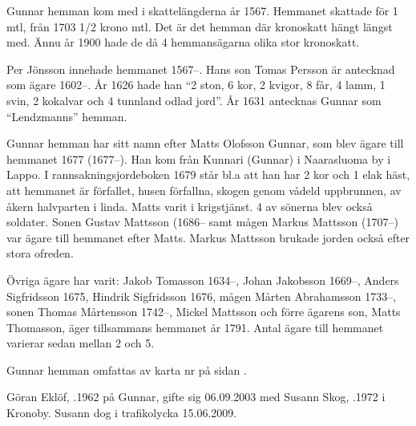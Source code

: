 %

Gunnar hemman kom med i skattelängderna år 1567. Hemmanet skattade för 1 mtl, från 1703  1/2 krono mtl. Det är det hemman där kronoskatt hängt längst med. Ännu år 1900 hade de då 4 hemmansägarna olika stor kronoskatt.

Per Jönsson innehade hemmanet 1567--. Hans son Tomas Persson är antecknad som ägare 1602--. År 1626 hade han ``2 ston, 6 kor, 2 kvigor, 8 får, 4 lamm, 1 svin, 2 kokalvar och 4 tunnland odlad jord''. År 1631 antecknas Gunnar som ``Lendzmanns'' hemman.

Gunnar hemman har sitt namn efter Matts Olofsson Gunnar, som blev ägare till hemmanet 1677 (1677--). Han kom från Kunnari (Gunnar) i Naarasluoma by i Lappo. I rannsakningsjordeboken 1679 står bl.a att han har 2 kor och 1 elak häst, att hemmanet är förfallet, husen förfallna, skogen genom vådeld uppbrunnen, av åkern halvparten i linda. Matts varit i krigstjänst. 4 av sönerna blev också soldater. Sonen Gustav Mattsson (1686-- samt mågen Markus Mattsson (1707--) var ägare till hemmanet efter Matts. Markus Mattsson brukade jorden också efter stora ofreden.

Övriga ägare har varit: Jakob Tomasson 1634--, Johan Jakobsson 1669--, Anders Sigfridsson 1675,  Hindrik Sigfridsson 1676,  mågen Mårten Abrahamsson 1733--, sonen Thomas Mårtensson 1742--, Mickel Mattsson och förre ägarens son, Matts Thomasson, äger tillsammans hemmanet år 1791. Antal ägare till hemmanet varierar sedan mellan 2 och 5.


Gunnar hemman omfattas av karta nr  på sidan \pageref{map:15}.




%



%



%
Göran Eklöf, .1962 på Gunnar, gifte sig 06.09.2003 med Susann Skog, .1972 i Kronoby. Susann dog i trafikolycka 15.06.2009.
\begin{jhchildren}
  \item {}
  \item {}
\end{jhchildren}

